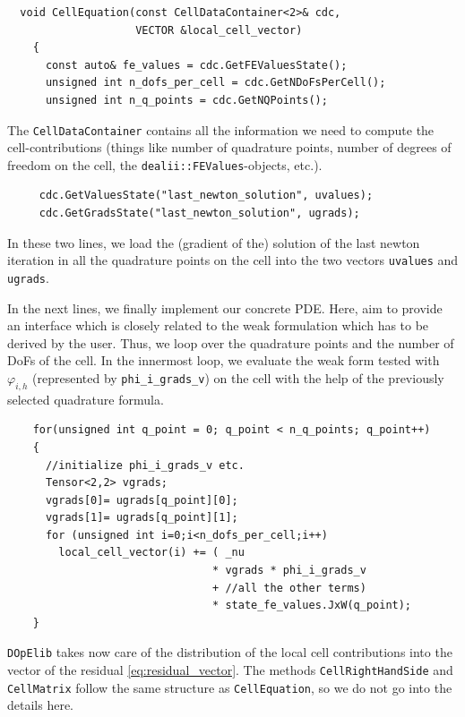 \documentclass[prodmode,acmtoms]{acmsmall}
\numberwithin{equation}{section}
\renewcommand{\phi}{\varphi}
\newcommand{\dope}{\texttt{DOpElib}}
\begin{document}
\begin{lstlisting}
  void CellEquation(const CellDataContainer<2>& cdc,
                    VECTOR &local_cell_vector)
    {
      const auto& fe_values = cdc.GetFEValuesState();
      unsigned int n_dofs_per_cell = cdc.GetNDoFsPerCell();
      unsigned int n_q_points = cdc.GetNQPoints();
\end{lstlisting}
 The \texttt{CellDataContainer} contains all the information we need to compute the cell-contributions (things like number of quadrature points, number of degrees of freedom on the cell, the \texttt{dealii::FEValues}-objects, etc.).
  \begin{lstlisting}
     cdc.GetValuesState("last_newton_solution", uvalues);
     cdc.GetGradsState("last_newton_solution", ugrads);
 \end{lstlisting}
 In these two lines, we load the (gradient of the) solution of the last newton iteration in all the quadrature points on the cell into the two vectors \texttt{uvalues} and \texttt{ugrads}.

In the next lines, we finally implement our concrete PDE. Here, aim to provide 
an interface which is closely related to the weak formulation which 
has to be derived by the user. Thus,
we loop over the quadrature points and the number of DoFs of the cell. In the innermost loop, we evaluate the weak form tested with $\phi_{i,h}$ (represented by \texttt{phi\_i\_grads\_v}) on the cell with the help of the previously selected quadrature formula. 
 \begin{lstlisting}
    for(unsigned int q_point = 0; q_point < n_q_points; q_point++)
    {
      //initialize phi_i_grads_v etc.
      Tensor<2,2> vgrads;
      vgrads[0]= ugrads[q_point][0]; 
      vgrads[1]= ugrads[q_point][1];
      for (unsigned int i=0;i<n_dofs_per_cell;i++)
        local_cell_vector(i) += ( _nu 
                                * vgrads * phi_i_grads_v 
                                + //all the other terms)
                                * state_fe_values.JxW(q_point);
    }
\end{lstlisting}
\dope{} takes now care of the distribution of the local cell contributions into  the vector of the residual \eqref{eq:residual_vector}. The methods \texttt{CellRightHandSide} and \texttt{CellMatrix} follow the same structure as 
\texttt{CellEquation}, so we do not go into the details here.
\end{document}
